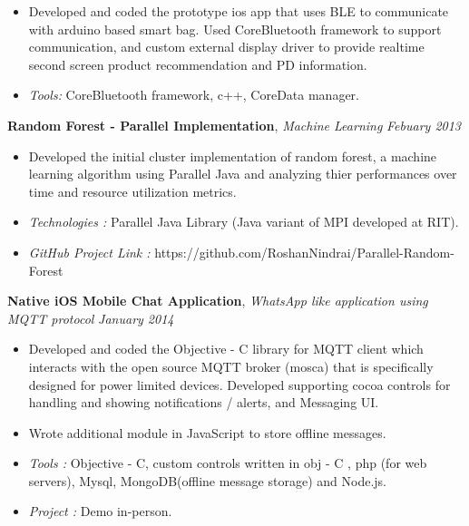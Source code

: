 \documentclass[9pt]{article}
\newenvironment{changemargin}[2]{%
  \begin{list}{}{%
    \setlength{\topsep}{0pt}%
    \setlength{\leftmargin}{#1}%
    \setlength{\rightmargin}{#2}%
    \setlength{\listparindent}{\parindent}%
    \setlength{\itemindent}{\parindent}%
    \setlength{\parsep}{\parskip}%
  }%
  \item[]}{\end{list}
}
\newenvironment{body} {
	\vspace*{-16pt}
	\begin{changemargin}{-0.25in}{-0.5in}
  }	
	{\end{changemargin}
}
\begin{document}
\begin{body}
	\vspace*{-4pt}
	\begin{itemize} \itemsep -0pt
	\item Developed and coded the prototype ios app that uses BLE to communicate with arduino based smart bag. Used CoreBluetooth framework to support communication, and custom external display driver to provide realtime second screen product recommendation and PD information.
	\item \emph{Tools:} CoreBluetooth framework, c++, CoreData manager.
\end{itemize}
	\textbf{Random Forest - Parallel Implementation}, \emph{Machine Learning} \hfill \emph{Febuary 2013}\\
	\vspace*{-4pt}
	\begin{itemize} \itemsep -0pt  %
		\item Developed the initial cluster implementation of random forest, a machine learning algorithm using Parallel Java and analyzing thier performances over time and resource utilization metrics.
\item \emph{Technologies :} Parallel Java Library (Java variant of MPI developed at RIT).
\item \emph{GitHub Project Link :} https://github.com/RoshanNindrai/Parallel-Random-Forest
	\end{itemize}

	\textbf { Native iOS Mobile Chat Application}, \emph{ WhatsApp like application using MQTT protocol } \hfill \emph{January 2014}\\
	\vspace*{-4pt}
	\begin{itemize} \itemsep -0pt
		\item Developed and coded the Objective - C library for MQTT client which interacts with the open source MQTT broker (mosca) that is specifically designed for power limited devices. Developed supporting cocoa controls for handling and showing notifications / alerts, and Messaging UI.\item Wrote additional module in JavaScript to store offline messages.
		\item \emph{Tools :} Objective - C, custom controls written in obj  - C , php (for web servers), Mysql, MongoDB(offline message storage) and Node.js.
\item \emph{Project :} Demo in-person. 
	

\end{itemize}
\end{body}
\end{document}
